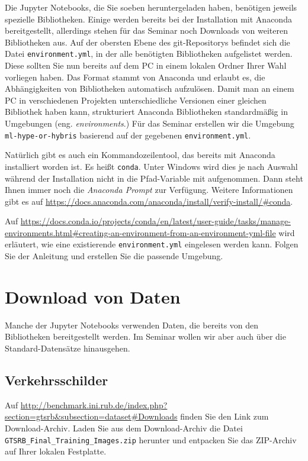 \documentclass{tufte-handout}
\begin{document}
Die Jupyter Notebooks, die Sie soeben heruntergeladen haben, benötigen jeweils spezielle Bibliotheken.
Einige werden bereits bei der Installation mit Anaconda bereitgestellt, allerdings stehen für das Seminar noch Downloads von weiteren Bibliotheken aus.
Auf der obersten Ebene des git-Repositorys befindet sich die Datei \texttt{environment.yml}, in der alle benötigten Bibliotheken aufgelistet werden.
Diese sollten Sie nun bereits auf dem PC in einem lokalen Ordner Ihrer Wahl vorliegen haben.
Das Format stammt von Anaconda und erlaubt es, die Abhängigkeiten von Bibliotheken automatisch aufzulösen.
Damit man an einem PC in verschiedenen Projekten unterschiedliche Versionen einer gleichen Bibliothek haben kann,
strukturiert Anaconda Bibliotheken standardmäßig in Umgebungen (eng. \emph{environments}.)
Für das Seminar erstellen wir die Umgebung \texttt{ml-hype-or-hybris} basierend auf der gegebenen \texttt{environment.yml}.

Natürlich gibt es auch ein Kommandozeilentool, das bereits mit Anaconda installiert worden ist.
Es heißt \texttt{conda}.
Unter Windows wird dies je nach Auswahl während der Installation nicht in die Pfad-Variable mit aufgenommen.
Dann steht Ihnen immer noch die \emph{Anaconda Prompt} zur Verfügung.
Weitere Informationen gibt es auf
\url{https://docs.anaconda.com/anaconda/install/verify-install/#conda}.

Auf
\url{https://docs.conda.io/projects/conda/en/latest/user-guide/tasks/manage-environments.html#creating-an-environment-from-an-environment-yml-file}
wird erläutert, wie eine existierende \texttt{environment.yml} eingelesen werden kann.
Folgen Sie der Anleitung und erstellen Sie die passende Umgebung.

\section{Download von Daten}

Manche der Jupyter Notebooks verwenden Daten, die bereits von den Bibliotheken bereitgestellt werden.
Im Seminar wollen wir aber auch über die Standard-Datensätze hinausgehen.

\subsection{Verkehrsschilder}

Auf \url{http://benchmark.ini.rub.de/index.php?section=gtsrb&subsection=dataset#Downloads} finden Sie den Link zum Download-Archiv.
Laden Sie aus dem Download-Archiv die Datei \texttt{GTSRB\_Final\_Training\_Images.zip} herunter und entpacken Sie das ZIP-Archiv auf Ihrer lokalen Festplatte.




\end{document}
